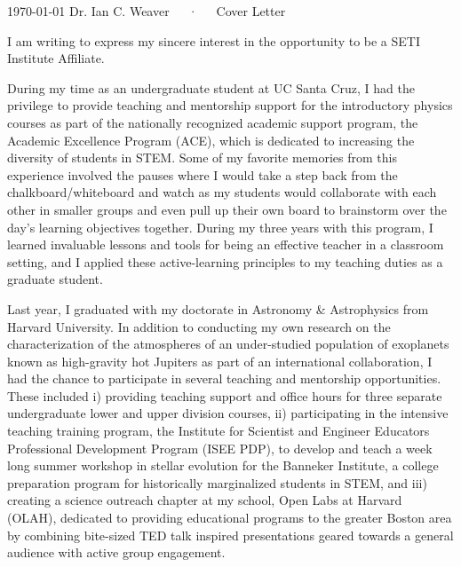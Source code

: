 \documentclass[11pt, a4paper]{awesome-cv}
\begin{document}
\makecvheader[R]

\makecvfooter
  {\today}
  {Dr. Ian C. Weaver~~~·~~~Cover Letter}
  {}

\makelettertitle

\begin{cvletter}
I am writing to express my sincere interest in the opportunity to be a SETI Institute Affiliate.

During my time as an undergraduate student at UC Santa Cruz, I had the privilege to provide
teaching and mentorship support for the introductory physics courses as part of the nationally
recognized academic support program, the Academic Excellence Program (ACE), which is
dedicated to increasing the diversity of students in STEM. Some of my favorite memories from this
experience involved the pauses where I would take a step back from the chalkboard/whiteboard
and watch as my students would collaborate with each other in smaller groups and even pull up
their own board to brainstorm over the day's learning objectives together. During my three years
with this program, I learned invaluable lessons and tools for being an effective teacher in a
classroom setting, and I applied these active-learning principles to my teaching duties as a
graduate student.

Last year, I graduated with my doctorate in Astronomy \& Astrophysics from Harvard
University. In addition to conducting my own research on the characterization of the atmospheres
of an under-studied population of exoplanets known as high-gravity hot Jupiters as part of an
international collaboration, I had the chance to participate in several teaching and mentorship
opportunities. These included i) providing teaching support and office hours for three separate
undergraduate lower and upper division courses, ii) participating in the intensive teaching training
program, the Institute for Scientist and Engineer Educators Professional Development Program
(ISEE PDP), to develop and teach a week long summer workshop in stellar evolution for the
Banneker Institute, a college preparation program for historically marginalized students in STEM,
and iii) creating a science outreach chapter at my school, Open Labs at Harvard (OLAH), dedicated
to providing educational programs to the greater Boston area by combining bite-sized TED talk
inspired presentations geared towards a general audience with active group engagement.


\end{cvletter}
\end{document}
